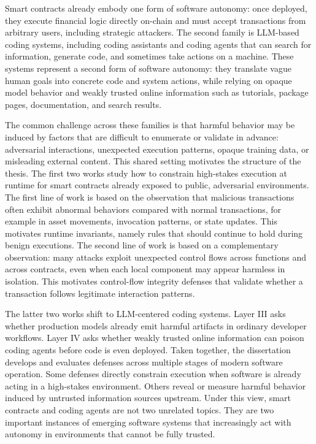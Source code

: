 Smart contracts already embody one form of software autonomy: once deployed, they execute financial logic directly on-chain and must accept transactions from arbitrary users, including strategic attackers. The second family is LLM-based coding systems, including coding assistants and coding agents that can search for information, generate code, and sometimes take actions on a machine. These systems represent a second form of software autonomy: they translate vague human goals into concrete code and system actions, while relying on opaque model behavior and weakly trusted online information such as tutorials, package pages, documentation, and search results.

The common challenge across these families is that harmful behavior may be induced by factors that are difficult to enumerate or validate in advance: adversarial interactions, unexpected execution patterns, opaque training data, or misleading external content. This shared setting motivates the structure of the thesis. The first two works study how to constrain high-stakes execution at runtime for smart contracts already exposed to public, adversarial environments. The first line of work is based on the observation that malicious transactions often exhibit abnormal behaviors compared with normal transactions, for example in asset movements, invocation patterns, or state updates. This motivates runtime invariants, namely rules that should continue to hold during benign executions. The second line of work is based on a complementary observation: many attacks exploit unexpected control flows across functions and across contracts, even when each local component may appear harmless in isolation. This motivates control-flow integrity defenses that validate whether a transaction follows legitimate interaction patterns.

The latter two works shift to LLM-centered coding systems. Layer III asks whether production models already emit harmful artifacts in ordinary developer workflows. Layer IV asks whether weakly trusted online information can poison coding agents before code is even deployed. Taken together, the dissertation develops and evaluates defenses across multiple stages of modern software operation. Some defenses directly constrain execution when software is already acting in a high-stakes environment. Others reveal or measure harmful behavior induced by untrusted information sources upstream. Under this view, smart contracts and coding agents are not two unrelated topics. They are two important instances of emerging software systems that increasingly act with autonomy in environments that cannot be fully trusted.
